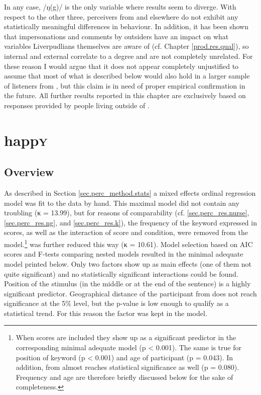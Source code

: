 In any case, /ŋ(g)/ is the only variable where results seem to diverge.
With respect to the other three, perceivers from  and elsewhere do not exhibit any statistically meaningful differences in behaviour.
In addition, it has been shown that impersonations and comments by outsiders have an impact on what variables Liverpudlians themselves are  aware of (cf. Chapter \ref{prod.res.qual}), so internal and external  correlate to a degree and are not completely unrelated.
For these reason I would argue that it does not appear completely unjustified to assume that most of what is described below would also hold in a larger sample of listeners from , but this claim is in need of proper empirical confirmation in the future.
All further results reported in this chapter are exclusively based on responses provided by people living outside of .

\section{happ\textrm{\textsc{y}}}
\label{sec.perc_res.happy}
	\subsection{Overview}
	\label{sec.perc_res.happy.overview}

As described in Section \ref{sec.perc_method.stats} a mixed effects ordinal regression model was fit to the data by hand.
This maximal model did not contain any troubling  (κ = 13.99), but for reasons of comparability (cf. \ref{sec.perc_res.nurse}, \ref{sec.perc_res.ng}, and \ref{sec.perc_res.k}), the frequency of the keyword expressed in  scores, as well as the interaction of  score and  condition, were removed from the model.\footnote{When  scores are included they show up as a significant predictor in the corresponding minimal adequate model (p < 0.001). The same is true for position of keyword (p < 0.001) and age of participant (p = 0.043). In addition,  from  almost reaches statistical significance as well (p = 0.080). Frequency and age are therefore briefly discussed below for the sake of completeness.}
 was further reduced this way (κ = 10.61).
Model selection based on AIC scores and F-tests comparing nested models resulted in the minimal adequate model printed below.
Only two factors show up as main effects (one of them not quite significant) and no statistically significant interactions could be found.
Position of the stimulus (in the middle or at the end of the sentence) is a highly significant predictor.
Geographical distance of the participant from  does not reach significance at the 5\% level, but the p-value is low enough to qualify as a statistical trend.
For this reason the factor was kept in the model.

